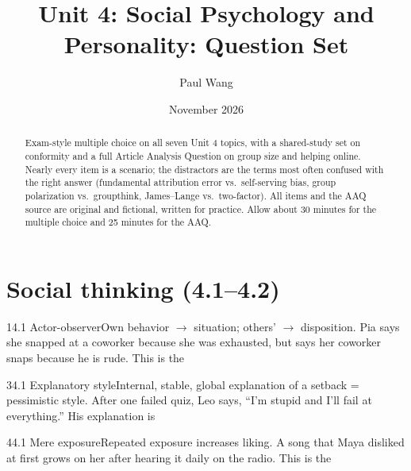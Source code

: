 \documentclass[11pt]{article}
\title{Unit 4: Social Psychology and Personality: Question Set}
\author{Paul Wang}
\date{November 2026}
\begin{document}
\maketitle

\begin{abstract}
Exam-style multiple choice on all seven Unit 4 topics, with a shared-study set on conformity and a full Article Analysis Question on group size and helping online. Nearly every item is a scenario; the distractors are the terms most often confused with the right answer (fundamental attribution error vs.\ self-serving bias, group polarization vs.\ groupthink, James--Lange vs.\ two-factor). All items and the AAQ source are original and fictional, written for practice. Allow about 30 minutes for the multiple choice and 25 minutes for the AAQ.
\end{abstract}


\section{Social thinking (4.1--4.2)}

\begin{q}{1}{4.1 Actor-observer}{Own behavior \(\rightarrow\) situation; others' \(\rightarrow\) disposition.}
Pia says she snapped at a coworker because she was exhausted, but says her coworker snaps because he is rude. This is the
\end{q}

\begin{q}{3}{4.1 Explanatory style}{Internal, stable, global explanation of a setback = pessimistic style.}
After one failed quiz, Leo says, ``I'm stupid and I'll fail at everything.'' His explanation is
\end{q}

\begin{q}{4}{4.1 Mere exposure}{Repeated exposure increases liking.}
A song that Maya disliked at first grows on her after hearing it daily on the radio. This is the
\end{q}
\end{document}
